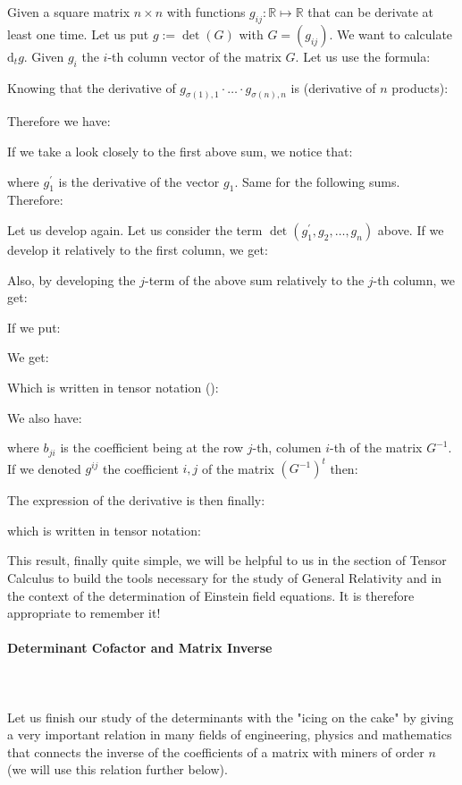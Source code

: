 	Given a square matrix $n\times n$ with functions $g_{ij}:\mathbb{R}\mapsto \mathbb{R}$ that can be derivate at least one time. Let us put $g:=\det(G)$ with $G=(g_{ij})$. We want to calculate $\mathrm{d}_t g$. Given $g_i$ the $i$-th column vector of the matrix $G$. Let us use the formula:
	
	Knowing that the derivative of $g_{\sigma(1),1}\cdot \ldots \cdot g_{\sigma(n),n}$ is (derivative of $n$ products):
	
	Therefore we have:
	
	If we take a look closely to the first above sum, we notice that:
	
	where $g_1^{'}$ is the derivative of the vector $g_1$. Same for the following sums. Therefore:
	
	Let us develop again. Let us consider the term $\det(g_1^{'},g_2,\ldots,g_n)$ above. If we develop it relatively to the first column, we get:
	
	 Also, by developing the $j$-term of the above sum relatively to the $j$-th column, we get:
	
	If we put:
	
	We get:
	
	Which is written in tensor notation ():
	
	We also have:
	
	where $b_{ji}$ is the coefficient being at the row $j$-th, columen $i$-th of the matrix $G^{-1}$. If we denoted $g^{ij}$ the coefficient $i,j$ of the matrix $(G^{-1})^t$ then:
	
	The expression of the derivative is then finally:
	
	which is written in tensor notation:
	
	This result, finally quite simple, we will be helpful to us in the section of Tensor Calculus to build the tools necessary for the study of General Relativity and in the context of the determination of Einstein field equations. It is therefore appropriate to remember it!
	
	\paragraph{Determinant Cofactor and Matrix Inverse}\label{determinant matrix inverse}\mbox{}\\\\
	Let us finish our study of the determinants with the "icing on the cake" by giving a very important relation in many fields of engineering, physics and mathematics that connects the inverse of the coefficients of a matrix with miners of order $n$ (we will use this relation further below).
	
